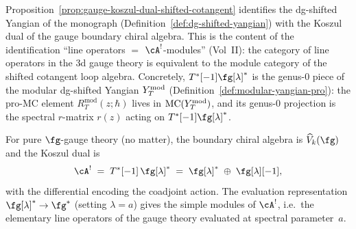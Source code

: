 \begin{remark}
\label{rem:dg-yangian-gauge-koszul}
Proposition~\ref{prop:gauge-koszul-dual-shifted-cotangent} identifies
the dg-shifted Yangian of the monograph
(Definition~\ref{def:dg-shifted-yangian}) with the Koszul dual of
the gauge boundary chiral algebra. This is the content of the
identification ``line operators $=$ $\cA^!$-modules''
(Vol~II): the category of
line operators in the 3d gauge theory is equivalent to the module
category of the shifted cotangent loop algebra.
Concretely, $T^*[-1]\fg[\lambda]^*$ is the
genus-$0$ piece of the modular dg-shifted Yangian $Y^{\mathrm{mod}}_T$
(Definition~\ref{def:modular-yangian-pro}): the pro-MC element
$R_T^{\mathrm{mod}}(z;\hbar)$ lives in
$\operatorname{MC}(Y^{\mathrm{mod}}_T)$, and its genus-$0$ projection is
the spectral $r$-matrix $r(z)$ acting on
$T^*[-1]\fg[\lambda]^*$.
\end{remark}

\begin{example}
\label{ex:pure-gauge-koszul-dual}
For pure $\fg$-gauge theory (no matter), the boundary chiral algebra
is $\widehat{V}_k(\fg)$ and the Koszul dual is
\begin{equation}\label{eq:pure-gauge-koszul}
 \cA^!
 \;=\;
 T^*[-1]\,\fg[\lambda]^*
 \;=\;
 \fg[\lambda]^* \;\oplus\; \fg[\lambda][-1],
\end{equation}
with the differential encoding the coadjoint action. The evaluation
representation $\fg[\lambda]^* \to \fg^*$ (setting $\lambda = a$) gives
the simple modules of $\cA^!$, i.e.\ the elementary line operators of
the gauge theory evaluated at spectral parameter~$a$.
\end{example}

